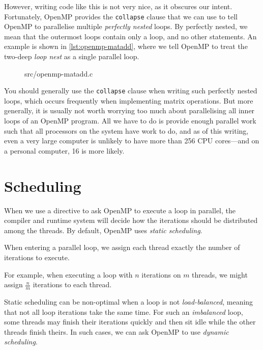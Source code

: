 However, writing code like this is not very nice, as it obscures our
intent.  Fortunately, OpenMP provides the \texttt{collapse} clause
that we can use to tell OpenMP to parallelise multiple \emph{perfectly
  nested} loops.  By perfectly nested, we mean that the outermost
loops contain only a loop, and no other statements.  An example is
shown in \cref{lst:openmp-matadd}, where we tell OpenMP to treat the
two-deep \emph{loop nest} as a single parallel loop.

\begin{figure}[!h]

{src/openmp-matadd.c}
\end{figure}

You should generally use the \texttt{collapse} clause when writing
such perfectly nested loops, which occurs frequently when implementing
matrix operations.  But more generally, it is usually not worth
worrying too much about parallelising all inner loops of an OpenMP
program.  All we have to do is provide enough parallel work such that
all processors on the system have work to do, and as of this writing,
even a very large computer is unlikely to have more than 256 CPU
cores---and on a personal computer, 16 is more likely.

\section{Scheduling}

When we use a directive to ask OpenMP to execute a loop in parallel,
the compiler and runtime system will decide how the iterations should
be distributed among the threads.  By default, OpenMP uses
\emph{static scheduling}.

\begin{definition}
  When entering a parallel loop, we assign each thread exactly the
  number of iterations to execute.
\end{definition}

For example, when executing a loop with $n$ iterations on $m$ threads,
we might assign $\frac{n}{m}$ iterations to each thread.

Static scheduling can be non-optimal when a loop is not
\emph{load-balanced}, meaning that not all loop iterations take the
same time.  For such an \emph{imbalanced} loop, some threads may
finish their iterations quickly and then sit idle while the other
threads finish theirs.  In such cases, we can ask OpenMP to use
\emph{dynamic scheduling}.

